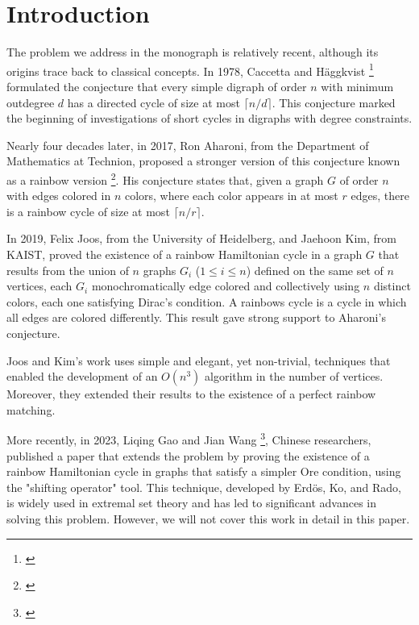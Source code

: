 
\chapter*{Introduction}

The problem we address in the monograph is relatively recent, although its origins trace back to classical concepts. 
In 1978, Caccetta and Häggkvist \footnote{\cite{nathanson2006caccettahaggkvistconjectureadditivenumber}} formulated the conjecture 
that every simple digraph of order $n$ with minimum outdegree $d$ 
has a directed cycle of size at most $\lceil n/d \rceil$. This conjecture marked the beginning of investigations 
of short cycles in digraphs with degree constraints.

Nearly four decades later, in 2017, Ron Aharoni, from the Department of Mathematics at Technion, proposed a stronger 
version of this conjecture known as a rainbow version \footnote{\cite{AharonisConjecture}}. His conjecture states that, given a graph $G$ of order $n$ 
with edges colored in $n$ colors, where each color appears in at most $r$ edges, there is a rainbow cycle of size 
at most $\lceil n/r \rceil$.

In 2019, Felix Joos, from the University of Heidelberg, and Jaehoon Kim, from KAIST, 
proved the existence of a rainbow Hamiltonian cycle in a graph $G$ that results from the union of $n$ graphs
$G_i$ ($1 \leq i \leq n$) defined on the same set of $n$ vertices, each $G_i$ monochromatically edge colored
and collectively using $n$ distinct colors, each one satisfying Dirac's condition. A rainbows cycle is a cycle 
in which all edges are colored differently. This result gave strong support to Aharoni's conjecture.

Joos and Kim's work uses simple and elegant, yet non-trivial, techniques that enabled the development of an $O(n^3)$ 
algorithm in the number of vertices. Moreover, they extended their results to the existence of a perfect rainbow 
matching.

More recently, in 2023, Liqing Gao and Jian Wang \footnote{\cite{gao_wang_2024}}, Chinese researchers, published a paper that extends the problem 
by proving the existence of a rainbow Hamiltonian cycle in graphs that satisfy a simpler Ore condition, using the 
"shifting operator" tool. This technique, developed by Erdös, Ko, and Rado, is widely used in extremal set theory 
and has led to significant advances in solving this problem. However, we will not cover this work in detail in 
this paper.

